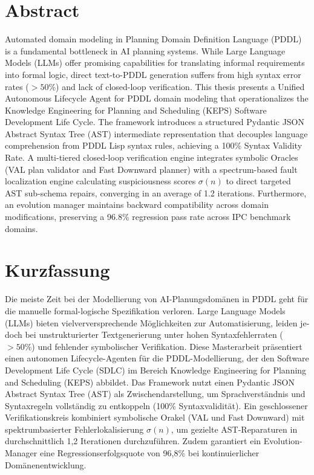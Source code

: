 \documentclass[
  numbers=noenddot,
  english,  %
  a4paper,  %
  twoside,  %
  bibliography=totoc,
  headsepline,
  cleardoublepage=empty,
  parskip=half,
  draft=false
]{scrbook}
\theoremstyle{break}
\begin{document}
\raggedbottom
{}
\Titelblatt

\pagestyle{plain.scrheadings}
\renewcommand*{\chapterpagestyle}{plain.scrheadings}

\section*{Abstract}
Automated domain modeling in Planning Domain Definition Language (PDDL) is a fundamental bottleneck in AI planning systems. While Large Language Models (LLMs) offer promising capabilities for translating informal requirements into formal logic, direct text-to-PDDL generation suffers from high syntax error rates ($>50\%$) and lack of closed-loop verification. This thesis presents a Unified Autonomous Lifecycle Agent for PDDL domain modeling that operationalizes the Knowledge Engineering for Planning and Scheduling (KEPS) Software Development Life Cycle. The framework introduces a structured Pydantic JSON Abstract Syntax Tree (AST) intermediate representation that decouples language comprehension from PDDL Lisp syntax rules, achieving a 100\% Syntax Validity Rate. A multi-tiered closed-loop verification engine integrates symbolic Oracles (VAL plan validator and Fast Downward planner) with a spectrum-based fault localization engine calculating suspiciousness scores $\sigma(n)$ to direct targeted AST sub-schema repairs, converging in an average of 1.2 iterations. Furthermore, an evolution manager maintains backward compatibility across domain modifications, preserving a 96.8\% regression pass rate across IPC benchmark domains.

\section*{Kurzfassung}
\begin{otherlanguage}{ngerman}
Die meiste Zeit bei der Modellierung von AI-Planungsdomänen in PDDL geht für die manuelle formal-logische Spezifikation verloren. Large Language Models (LLMs) bieten vielverversprechende Möglichkeiten zur Automatisierung, leiden jedoch bei unstrukturierter Textgenerierung unter hohen Syntaxfehlerraten ($>50\%$) und fehlender symbolischer Verifikation. Diese Masterarbeit präsentiert einen autonomen Lifecycle-Agenten für die PDDL-Modellierung, der den Software Development Life Cycle (SDLC) im Bereich Knowledge Engineering for Planning and Scheduling (KEPS) abbildet. Das Framework nutzt einen Pydantic JSON Abstract Syntax Tree (AST) als Zwischendarstellung, um Sprachverständnis und Syntaxregeln vollständig zu entkoppeln (100\% Syntaxvalidität). Ein geschlossener Verifikationskreis kombiniert symbolische Orakel (VAL und Fast Downward) mit spektrumbasierter Fehlerlokalisierung $\sigma(n)$, um gezielte AST-Reparaturen in durchschnittlich 1,2 Iterationen durchzuführen. Zudem garantiert ein Evolution-Manager eine Regressionserfolgsquote von 96,8\% bei kontinuierlicher Domänenentwicklung.
\end{otherlanguage}
\end{document}
